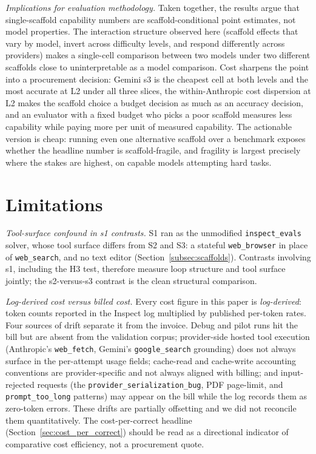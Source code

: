 \documentclass[10pt]{article} %
\begin{document}
    \textit{Implications for evaluation methodology.} Taken together, the results argue that single-scaffold capability numbers are scaffold-conditional point estimates, not model properties. The interaction structure observed here (scaffold effects that vary by model, invert across difficulty levels, and respond differently across providers) makes a single-cell comparison between two models under two different scaffolds close to uninterpretable as a model comparison. Cost sharpens the point into a procurement decision: Gemini s3 is the cheapest cell at both levels and the most accurate at L2 under all three slices, the within-Anthropic cost dispersion at L2 makes the scaffold choice a budget decision as much as an accuracy decision, and an evaluator with a fixed budget who picks a poor scaffold measures less capability while paying more per unit of measured capability. The actionable version is cheap: running even one alternative scaffold over a benchmark exposes whether the headline number is scaffold-fragile, and fragility is largest precisely where the stakes are highest, on capable models attempting hard tasks.

\section{Limitations}\label{sec:limitations}

    \textit{Tool-surface confound in s1 contrasts.} S1 ran as the unmodified \texttt{inspect\_evals} solver, whose tool surface differs from S2 and S3: a stateful \texttt{web\_browser} in place of \texttt{web\_search}, and no text editor (Section~\ref{subsec:scaffolds}). Contrasts involving s1, including the H3 test, therefore measure loop structure and tool surface jointly; the s2-versus-s3 contrast is the clean structural comparison.
    
    \textit{Log-derived cost versus billed cost.} Every cost figure in this paper is \emph{log-derived}: token counts reported in the Inspect log multiplied by published per-token rates. Four sources of drift separate it from the invoice. Debug and pilot runs hit the bill but are absent from the validation corpus; provider-side hosted tool execution (Anthropic's \texttt{web\_fetch}, Gemini's \texttt{google\_search} grounding) does not always surface in the per-attempt usage fields; cache-read and cache-write accounting conventions are provider-specific and not always aligned with billing; and input-rejected requests (the \texttt{provider\_serialization\_bug}, PDF page-limit, and \texttt{prompt\_too\_long} patterns) may appear on the bill while the log records them as zero-token errors. These drifts are partially offsetting and we did not reconcile them quantitatively. The cost-per-correct headline (Section~\ref{sec:cost_per_correct}) should be read as a directional indicator of comparative cost efficiency, not a procurement quote.
\end{document}
